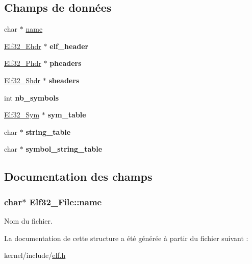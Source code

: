\subsection*{Champs de données}
\begin{DoxyCompactItemize}
\item 
char $\ast$ \hyperlink{structElf32__File_ad72bb34e9388d51790c6059cdd122137}{name}
\item 
\hypertarget{structElf32__File_ac8df03922d25955e8e597c061a5e228e}{\hyperlink{structElf32__Ehdr}{Elf32\+\_\+\+Ehdr} $\ast$ {\bfseries elf\+\_\+header}}\label{structElf32__File_ac8df03922d25955e8e597c061a5e228e}

\item 
\hypertarget{structElf32__File_a6ff1304dbfdc29691fc0756faeebf2b1}{\hyperlink{structElf32__Phdr}{Elf32\+\_\+\+Phdr} $\ast$ {\bfseries pheaders}}\label{structElf32__File_a6ff1304dbfdc29691fc0756faeebf2b1}

\item 
\hypertarget{structElf32__File_aa62b3fae81faacc3ede185f4ada96d65}{\hyperlink{structElf32__Shdr}{Elf32\+\_\+\+Shdr} $\ast$ {\bfseries sheaders}}\label{structElf32__File_aa62b3fae81faacc3ede185f4ada96d65}

\item 
\hypertarget{structElf32__File_a153a673f289468d35118dae8299d96aa}{int {\bfseries nb\+\_\+symbols}}\label{structElf32__File_a153a673f289468d35118dae8299d96aa}

\item 
\hypertarget{structElf32__File_a9fb4df42bf3b43251eb3657d4acc7a71}{\hyperlink{structElf32__Sym}{Elf32\+\_\+\+Sym} $\ast$ {\bfseries sym\+\_\+table}}\label{structElf32__File_a9fb4df42bf3b43251eb3657d4acc7a71}

\item 
\hypertarget{structElf32__File_a0b326fa5b82dc0d378b5c28608796ae6}{char $\ast$ {\bfseries string\+\_\+table}}\label{structElf32__File_a0b326fa5b82dc0d378b5c28608796ae6}

\item 
\hypertarget{structElf32__File_abe6e60d88f24c924a8bf536f4d76d724}{char $\ast$ {\bfseries symbol\+\_\+string\+\_\+table}}\label{structElf32__File_abe6e60d88f24c924a8bf536f4d76d724}

\end{DoxyCompactItemize}


\subsection{Documentation des champs}
\hypertarget{structElf32__File_ad72bb34e9388d51790c6059cdd122137}{
\subsubsection[{name}]{\setlength{\rightskip}{0pt plus 5cm}char$\ast$ Elf32\+\_\+\+File\+::name}}\label{structElf32__File_ad72bb34e9388d51790c6059cdd122137}
Nom du fichier. 

La documentation de cette structure a été générée à partir du fichier suivant \+:\begin{DoxyCompactItemize}
\item 
kernel/include/\hyperlink{elf_8h}{elf.\+h}\end{DoxyCompactItemize}
